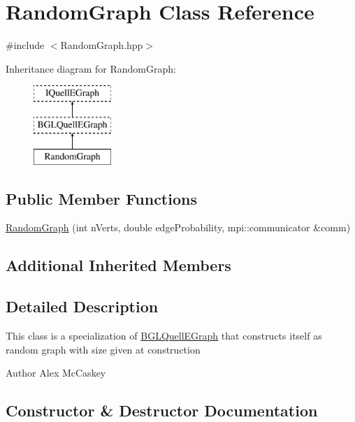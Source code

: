 \hypertarget{a00104}{}\section{Random\+Graph Class Reference}
\label{a00104}


{\ttfamily \#include $<$Random\+Graph.\+hpp$>$}

Inheritance diagram for Random\+Graph\+:\begin{figure}[H]
\begin{center}
\leavevmode
\includegraphics[height=3.000000cm]{a00104}
\end{center}
\end{figure}
\subsection*{Public Member Functions}
\begin{DoxyCompactItemize}
\item 
\hyperlink{a00104_ac0c674c867b017c1bdf18386d6656f7e}{Random\+Graph} (int n\+Verts, double edge\+Probability, mpi\+::communicator \&comm)
\end{DoxyCompactItemize}
\subsection*{Additional Inherited Members}


\subsection{Detailed Description}
This class is a specialization of \hyperlink{a00026}{B\+G\+L\+Quell\+E\+Graph} that constructs itself as random graph with size given at construction

\begin{DoxyAuthor}{Author}
Alex Mc\+Caskey 
\end{DoxyAuthor}


\subsection{Constructor \& Destructor Documentation}
